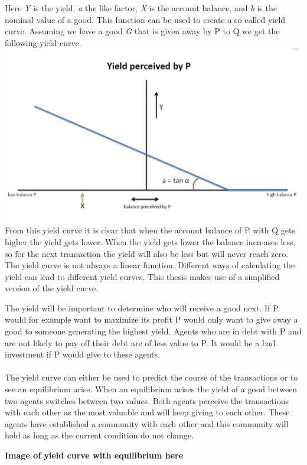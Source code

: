 \documentclass[twoside,openright]{uva-bachelor-thesis}
\begin{document}
Here \textit{Y} is the yield, \textit{a} the like factor, \textit{X} is the account balance, and \textit{b} is the nominal value of a good. This function can be used to create a so called yield curve. Assuming we have a good \textit{G} that is given away by P to Q we get the following yield curve.
\\
\includegraphics[scale=0.4]{YieldCurves/yieldcurve_P}
\\
From this yield curve it is clear that when the account balance of P with Q gets higher the yield gets lower.  When the yield gets lower the balance increases less, so for the next transaction the yield will also be less but will never reach zero.
The yield curve is not always a linear function. Different ways of calculating the yield can lead to different yield curves. This thesis makes use of a simplified version of the yield curve.

The yield will be important to determine who will receive a good next. If P would for example want to maximize its profit P would only want to give away a good to someone generating the highest yield. Agents who are in debt with P and are not likely to pay off their debt are of less value to P. It would be a bad investment if P would give to these agents.
\\
\\
The yield curve can either be used to predict the course of the transactions or to see an equilibrium arise. When an equilibrium arises the yield of a good between two agents switches between two values.  Both agents perceive the transactions with each other as the most valuable and will keep giving to each other. These agents have established a community with each other and this community will hold as long as the current condition do not change. 

\textbf{Image of yield curve with equilibrium here}
\end{document}
